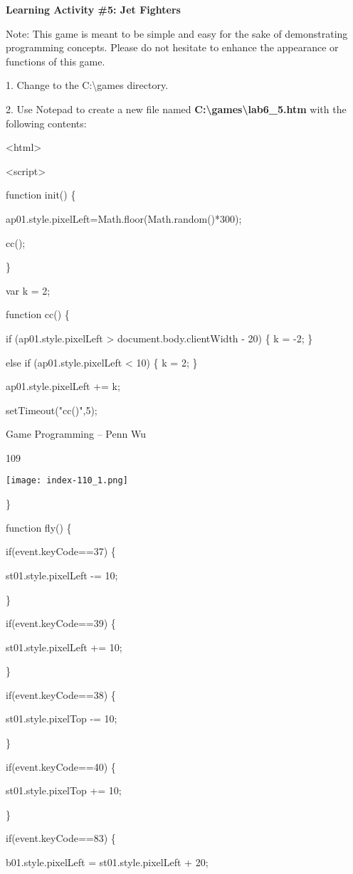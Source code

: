 \documentclass[
]{article}
\begin{document}
\textbf{Learning Activity \#5: Jet Fighters}

Note: This game is meant to be simple and easy for the sake of
demonstrating programming concepts. Please do not hesitate to enhance
the appearance or functions of this game.

1. Change to the C:\textbackslash games directory.

2. Use Notepad to create a new file named
\textbf{C:\textbackslash games\textbackslash lab6\_5.htm} with the
following contents:

\textless html\textgreater{}

\textless script\textgreater{}

function init() \{

ap01.style.pixelLeft=Math.floor(Math.random()*300);

cc();

\}

var k = 2;

function cc() \{

if (ap01.style.pixelLeft \textgreater{} document.body.clientWidth - 20)
\{ k = -2; \}

else if (ap01.style.pixelLeft \textless{} 10) \{ k = 2; \}

ap01.style.pixelLeft += k;

setTimeout("cc()",5);

Game Programming -- Penn Wu

109

\protect\hypertarget{index_split_007.htmlux5cux23p110}{}{}\texttt{[image: index-110\_1.png]}

\}

function fly() \{

if(event.keyCode==37) \{

st01.style.pixelLeft -= 10;

\}

if(event.keyCode==39) \{

st01.style.pixelLeft += 10;

\}

if(event.keyCode==38) \{

st01.style.pixelTop -= 10;

\}

if(event.keyCode==40) \{

st01.style.pixelTop += 10;

\}

if(event.keyCode==83) \{

b01.style.pixelLeft = st01.style.pixelLeft + 20;
\end{document}
